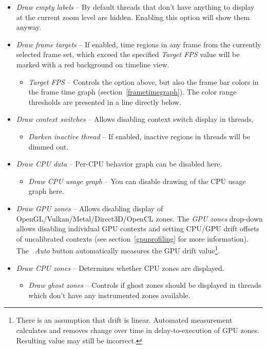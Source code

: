 \documentclass[hidelinks,titlepage,a4paper,twoside]{article}
\begin{document}
\begin{itemize}
\item \emph{\faExpand{} Draw empty labels} -- By default threads that don't have anything to display at the current zoom level are hidden. Enabling this option will show them anyway.
\item \emph{\faFlagCheckered{} Draw frame targets} -- If enabled, time regions in any frame from the currently selected frame set, which exceed the specified \emph{Target FPS} value will be marked with a red background on timeline view.
\begin{itemize}
\item \emph{Target FPS} -- Controls the option above, but also the frame bar colors in the frame time graph (section~\ref{frametimegraph}). The color range thresholds are presented in a line directly below.
\end{itemize}
\item \emph{\faHiking{} Draw context switches} -- Allows disabling context switch display in threads.
\begin{itemize}
\item \emph{\faMoon{} Darken inactive thread} -- If enabled, inactive regions in threads will be dimmed out.
\end{itemize}
\item \emph{\faSlidersH{} Draw CPU data} -- Per-CPU behavior graph can be disabled here.
\begin{itemize}
\item \emph{\faSignature{} Draw CPU usage graph} -- You can disable drawing of the CPU usage graph here.
\end{itemize}
\item \emph{\faEye{} Draw GPU zones} -- Allows disabling display of OpenGL/Vulkan/Metal/Direct3D/OpenCL zones. The \emph{GPU zones} drop-down allows disabling individual GPU contexts and setting CPU/GPU drift offsets of uncalibrated contexts (see section~\ref{gpuprofiling} for more information). The \emph{\faRobot~Auto} button automatically measures the GPU drift value\footnote{There is an assumption that drift is linear. Automated measurement calculates and removes change over time in delay-to-execution of GPU zones. Resulting value may still be incorrect.}.
\item \emph{\faMicrochip{} Draw CPU zones} -- Determines whether CPU zones are displayed.
\begin{itemize}
\item \emph{\faGhost{} Draw ghost zones} -- Controls if ghost zones should be displayed in threads which don't have any instrumented zones available.

\end{itemize}
\end{itemize}
\end{document}
